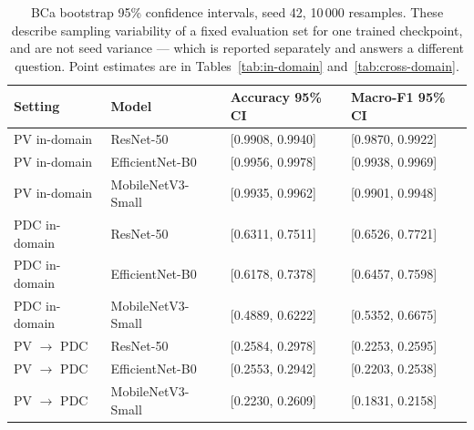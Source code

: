 \begin{table}[htbp]
\caption{BCa bootstrap 95\% confidence intervals, seed 42, 10\,000 resamples. These describe sampling variability of a fixed evaluation set for one trained checkpoint, and are not seed variance --- which is reported separately and answers a different question. Point estimates are in Tables~\ref{tab:in-domain} and~\ref{tab:cross-domain}.}
\label{tab:confidence-intervals-compact}
\footnotesize
\centering
\begin{tabular}{llll}
\toprule
Setting & Model & Accuracy 95\% CI & Macro-F1 95\% CI \\
\midrule
PV in-domain & ResNet-50 & [0.9908, 0.9940] & [0.9870, 0.9922] \\
PV in-domain & EfficientNet-B0 & [0.9956, 0.9978] & [0.9938, 0.9969] \\
PV in-domain & MobileNetV3-Small & [0.9935, 0.9962] & [0.9901, 0.9948] \\
PDC in-domain & ResNet-50 & [0.6311, 0.7511] & [0.6526, 0.7721] \\
PDC in-domain & EfficientNet-B0 & [0.6178, 0.7378] & [0.6457, 0.7598] \\
PDC in-domain & MobileNetV3-Small & [0.4889, 0.6222] & [0.5352, 0.6675] \\
PV $\rightarrow$ PDC & ResNet-50 & [0.2584, 0.2978] & [0.2253, 0.2595] \\
PV $\rightarrow$ PDC & EfficientNet-B0 & [0.2553, 0.2942] & [0.2203, 0.2538] \\
PV $\rightarrow$ PDC & MobileNetV3-Small & [0.2230, 0.2609] & [0.1831, 0.2158] \\
\bottomrule
\end{tabular}
\end{table}
